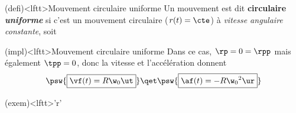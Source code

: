 \documentclass[../../main/main.tex]{subfiles}
\begin{document}
\begin{tcbraster}[raster equal height=rows, raster columns=4]
	\begin{tcolorbox}[blankest, raster multicolumn=3, space to=\myspace]
		\begin{tcb*}(defi)<lftt>{Mouvement circulaire uniforme}
			Un mouvement est dit \textbf{circulaire \textit{uniforme}} si c'est un
			mouvement circulaire ($r(t) = \cte$) à \textit{vitesse angulaire
				constante}, soit
			\psw{%
				\[
					r(t) = R
					\qet
					\tp(t) = \w_0
				\]
			}%
			\vspace{-25pt}
		\end{tcb*}
		\begin{tcb}(impl)<lftt>{Mouvement circulaire uniforme}
			Dans ce cas, $\rp = 0 = \rpp$ mais également $\tpp = 0$, donc la vitesse et
			l'accélération donnent
			\[
				\psw{\boxed{\vf(t) = R\w_0\ut}}
				\qet
				\psw{\boxed{\af(t) = -R\w_0{}^2\ur}}
			\]
			\vspace{-25pt}
		\end{tcb}
	\end{tcolorbox}
	\begin{tcb}[list entry={\lte\theexem~:~Mouvement circulaire uniforme}](exem)<lftt>'r'{}
		\vspace{-25pt}
		\begin{center}
\end{center}
\end{tcb}
\end{tcbraster}
\end{document}
